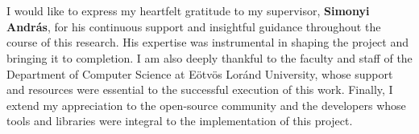 \documentclass[
]{elteikthesis}[2024/04/26]
\begin{document}

\cleardoublepage


\cleardoublepage


\cleardoublepage

\chapter*{\acklabel}
I would like to express my heartfelt gratitude to my supervisor, \textbf{Simonyi András}, for his continuous support and insightful guidance throughout the course of this research. His expertise was instrumental in shaping the project and bringing it to completion.
I am also deeply thankful to the faculty and staff of the Department of Computer Science at Eötvös Loránd University, whose support and resources were essential to the successful execution of this work.
Finally, I extend my appreciation to the open-source community and the developers whose tools and libraries were integral to the implementation of this project.

% 

{}
\printbibliography[title=\biblabel]
\cleardoublepage

{}
\listoffigures
\cleardoublepage

{}
\listoftables
\cleardoublepage

 

\end{document}
